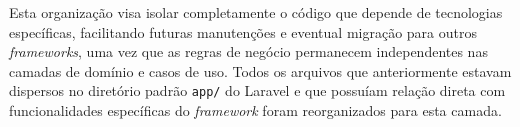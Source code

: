     
    
    \par Esta organização visa isolar completamente o código que depende de tecnologias específicas, facilitando futuras manutenções e eventual migração para outros \textit{frameworks}, uma vez que as regras de negócio permanecem independentes nas camadas de domínio e casos de uso. Todos os arquivos que anteriormente estavam dispersos no diretório padrão \texttt{app/} do Laravel e que possuíam relação direta com funcionalidades específicas do \textit{framework} foram reorganizados para esta camada.